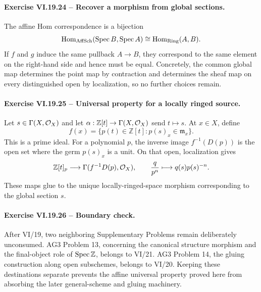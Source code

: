 \paragraph{Exercise VI.19.24 -- Recover a morphism from global sections.}
\begin{solution}
The affine Hom correspondence is a bijection
\[
\operatorname{Hom}_{\mathrm{AffSch}}(\operatorname{Spec} B,\operatorname{Spec} A)
\cong
\operatorname{Hom}_{\mathrm{Ring}}(A,B).
\]
If \(f\) and \(g\) induce the same pullback \(A\to B\), they correspond to the same element on the right-hand side and hence must be equal.  Concretely, the common global map determines the point map by contraction and determines the sheaf map on every distinguished open by localization, so no further choices remain.
\end{solution}

\paragraph{Exercise VI.19.25 -- Universal property for a locally ringed source.}
\begin{solution}
Let \(s\in\Gamma(X,\mathcal O_X)\) and let \(\alpha:\mathbb Z[t]\to\Gamma(X,\mathcal O_X)\) send \(t\mapsto s\).  At \(x\in X\), define
\[
f(x)=\{p(t)\in\mathbb Z[t]:p(s)_x\in\mathfrak m_x\}.
\]
This is a prime ideal.  For a polynomial \(p\), the inverse image \(f^{-1}(D(p))\) is the open set where the germ \(p(s)_x\) is a unit.  On that open, localization gives
\[
\mathbb Z[t]_p\longrightarrow\Gamma(f^{-1}D(p),\mathcal O_X),
\qquad
\frac{q}{p^n}\longmapsto q(s)p(s)^{-n}.
\]
These maps glue to the unique locally-ringed-space morphism corresponding to the global section \(s\).
\end{solution}

\paragraph{Exercise VI.19.26 -- Boundary check.}
\begin{solution}
After VI/19, two neighboring Supplementary Problems remain deliberately unconsumed.  AG3 Problem 13, concerning the canonical structure morphism and the final-object role of \(\operatorname{Spec}\mathbb Z\), belongs to VI/21.  AG3 Problem 14, the gluing construction along open subschemes, belongs to VI/20.  Keeping these destinations separate prevents the affine universal property proved here from absorbing the later general-scheme and gluing machinery.
\end{solution}
